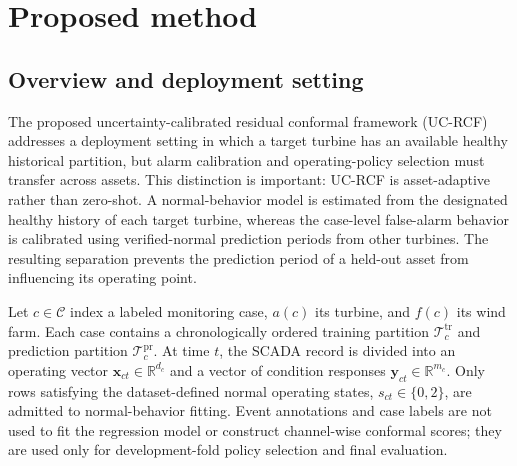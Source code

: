 %

\section{Proposed method}
\label{sec:proposed_method}

\subsection{Overview and deployment setting}

The proposed uncertainty-calibrated residual conformal framework (UC-RCF)
addresses a deployment setting in which a target turbine has an available
healthy historical partition, but alarm calibration and operating-policy
selection must transfer across assets. This distinction is important: UC-RCF
is asset-adaptive rather than zero-shot. A normal-behavior model is estimated
from the designated healthy history of each target turbine, whereas the
case-level false-alarm behavior is calibrated using verified-normal prediction
periods from other turbines. The resulting separation prevents the prediction
period of a held-out asset from influencing its operating point.

Let $c\in\mathcal{C}$ index a labeled monitoring case, $a(c)$ its turbine, and
$f(c)$ its wind farm. Each case contains a chronologically ordered training
partition $\mathcal{T}^{\mathrm{tr}}_c$ and prediction partition
$\mathcal{T}^{\mathrm{pr}}_c$. At time $t$, the SCADA record is divided into an
operating vector $\mathbf{x}_{ct}\in\mathbb{R}^{d_c}$ and a vector of condition
responses $\mathbf{y}_{ct}\in\mathbb{R}^{m_c}$. Only rows satisfying the
dataset-defined normal operating states, $s_{ct}\in\{0,2\}$, are admitted to
normal-behavior fitting. Event annotations and case labels are not used to fit
the regression model or construct channel-wise conformal scores; they are used
only for development-fold policy selection and final evaluation.

